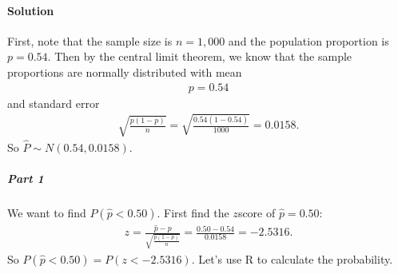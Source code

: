 \documentclass[letterpaper,10pt,english]{jupyterBook}
\begin{document}
\paragraph{Solution}
\label{\detokenize{Ch4 The Normal Distribution and the Central Limit Theorem/4.5 The Central Limit Theorem for Proportions:solution}}
\sphinxAtStartPar
First, note that the sample size is \(n = 1{,}000\) and the population proportion is \(p = 0.54\). Then by the central limit theorem, we know that the sample proportions are normally distributed with mean
\begin{equation*}
\begin{split} p = 0.54 \end{split}
\end{equation*}
\sphinxAtStartPar
and standard error
\begin{equation*}
\begin{split} \sqrt{\frac{p(1 - p)}{n}} = \sqrt{\frac{0.54(1 - 0.54)}{1000}} = 0.0158. \end{split}
\end{equation*}
\sphinxAtStartPar
So \(\hat{P} \sim N(0.54, 0.0158)\).


\subparagraph{Part 1}
\label{\detokenize{Ch4 The Normal Distribution and the Central Limit Theorem/4.5 The Central Limit Theorem for Proportions:part-1}}
\sphinxAtStartPar
We want to find \(P(\hat{p} < 0.50)\). First find the \(z\)\sphinxhyphen{}score of \(\hat{p} = 0.50\):
\begin{equation*}
\begin{split} z = \frac{\hat{p} - p}{\sqrt{\frac{p(1-p)}{n}}} = \frac{0.50 - 0.54}{0.0158} = -2.5316. \end{split}
\end{equation*}
\sphinxAtStartPar
So \(P(\hat{p} < 0.50) = P(z < -2.5316)\). Let’s use R to calculate the probability.
\end{document}
